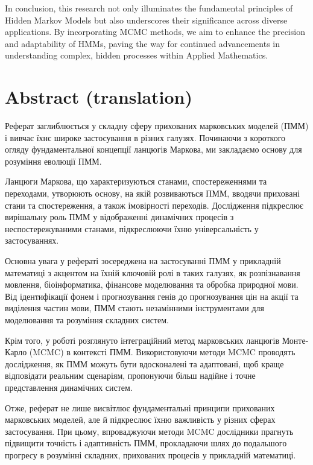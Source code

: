 \documentclass{englishreport}
\begin{document}
In conclusion, this research not only illuminates the fundamental principles of Hidden Markov Models but also underscores their significance across diverse applications. By incorporating MCMC methods, we aim to enhance the precision and adaptability of HMMs, paving the way for continued advancements in understanding complex, hidden processes within Applied Mathematics.

\newpage
\section*{Abstract (translation)}

Реферат заглиблюється у складну сферу прихованих марковських моделей (ПММ) і вивчає їхнє широке застосування в різних галузях. Починаючи з короткого огляду фундаментальної концепції ланцюгів Маркова, ми закладаємо основу для розуміння еволюції ПММ. 

Ланцюги Маркова, що характеризуються станами, спостереженнями та переходами, утворюють основу, на якій розвиваються ПММ, вводячи приховані стани та спостереження, а також імовірності переходів. Дослідження підкреслює вирішальну роль ПММ у відображенні динамічних процесів з неспостережуваними станами, підкреслюючи їхню універсальність у застосуваннях.

Основна увага у рефераті зосереджена на застосуванні ПММ у прикладній математиці з акцентом на їхній ключовій ролі в таких галузях, як розпізнавання мовлення, біоінформатика, фінансове моделювання та обробка природної мови. Від ідентифікації фонем і прогнозування генів до прогнозування цін на акції та виділення частин мови, ПММ стають незамінними інструментами для моделювання та розуміння складних систем.

Крім того, у роботі розглянуто інтеграційний метод марковських ланцюгів Монте-Карло (MCMC) в контексті ПММ. Використовуючи методи MCMC проводять дослідження, як ПММ можуть бути вдосконалені та адаптовані, щоб краще відповідати реальним сценаріям, пропонуючи більш надійне і точне представлення динамічних систем.

Отже, реферат не лише висвітлює фундаментальні принципи прихованих марковських моделей, але й підкреслює їхню важливість у різних сферах застосування. При цьому, впроваджуючи методи MCMC дослідники прагнуть підвищити точність і адаптивність ПММ, прокладаючи шлях до подальшого прогресу в розумінні складних, прихованих процесів у прикладній математиці.

\newpage
\end{document}
